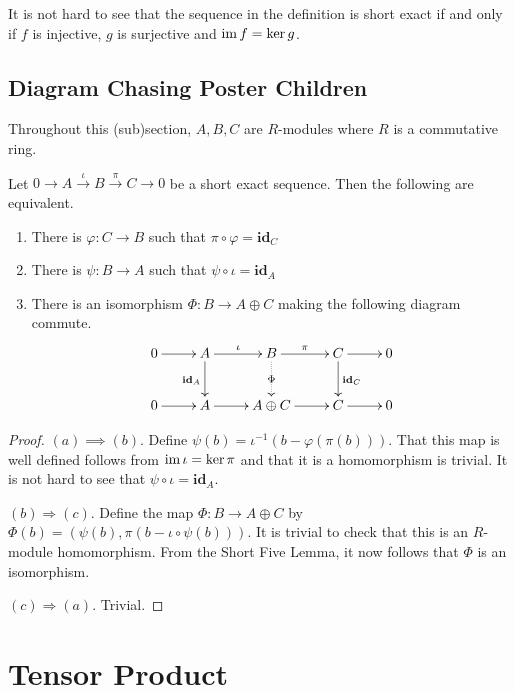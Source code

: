 It is not hard to see that the sequence in the definition is short exact if and only if $f$ is injective, $g$ is surjective and $\operatorname{im} f = \ker g$.

\subsection{Diagram Chasing Poster Children}
Throughout this (sub)section, $A,B,C$ are $R$-modules where $R$ is a commutative ring.

\begin{lemma}
    Let $0\longrightarrow A\stackrel{\iota}{\longrightarrow}B\stackrel{\pi}{\longrightarrow}C\longrightarrow 0$ be a short exact sequence. Then the following are equivalent.
    \begin{enumerate}[label=(\alph*)]
        \item There is $\varphi: C\to B$ such that $\pi\circ\varphi = \mathbf{id}_C$ 
        \item There is $\psi: B\to A$ such that $\psi\circ\iota = \mathbf{id}_A$ 
        \item There is an isomorphism $\Phi: B\to A\oplus C$ making the following diagram commute.
        \begin{equation*}
            \xymatrix {
                0\ar[r] & A\ar[d]_{\mathbf{id}_A}\ar[r]^\iota & B\ar[r]^\pi\ar@{.>}[d]|-{\Phi} & C\ar[d]^{\mathbf{id}_C}\ar[r] & 0\\
                0\ar[r] & A\ar[r] & A\oplus C\ar[r] & C\ar[r] & 0\\
            }
        \end{equation*}
    \end{enumerate}
\end{lemma}
\begin{proof}
$(a)\implies(b)$. Define $\psi(b) = \iota^{-1}(b - \varphi(\pi(b)))$. That this map is well defined follows from $\operatorname{im}\iota = \ker\pi$ and that it is a homomorphism is trivial. It is not hard to see that $\psi\circ\iota = \mathbf{id}_A$.

$(b)\Longrightarrow(c)$. Define the map $\Phi: B\to A\oplus C$ by $\Phi(b) = (\psi(b), \pi(b - \iota\circ\psi(b)))$. It is trivial to check that this is an $R$-module homomorphism. From the Short Five Lemma, it now follows that $\Phi$ is an isomorphism.

$(c)\Longrightarrow(a)$. Trivial.
\end{proof}


\section{Tensor Product}

